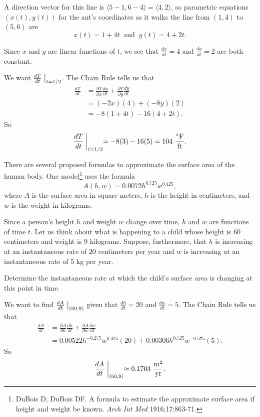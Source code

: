 \begin{exercises}
\begin{exerciseSolution}
    \ba
    \item A direction vector for this line is $\langle 5-1, 6-4 \rangle = \langle 4, 2 \rangle$, so parametric equations $(x(t),y(t))$ for the ant's coordinates as it walks the line from $(1,4)$ to $(5,6)$ are
\[x(t) = 1 + 4t \ \text{ and } \ y(t) = 4 + 2t.\]

	\item Since $x$ and $y$ are linear functions of $t$, we see that $\frac{dx}{dt} = 4$ and $\frac{dy}{dt} = 2$ are both constant. 
	
	\item We want $\frac{dT}{dt}\bigm|_{t=1/2}$. The Chain Rule tells us that 
	\begin{align*}
	\frac{dT}{dt} &= \frac{\partial T}{\partial x} \frac{dx}{dt} + \frac{\partial T}{\partial y} \frac{dy}{dt} \\
		&= (-2x)(4) + (-8y)(2) \\
		&= -8(1 + 4t) - 16(4 + 2t).
	\end{align*}
	So
	\[\frac{dT}{dt}\biggm|_{t=1/2} = -8(3) - 16(5) = 104 \ \frac{^{\circ}\text{F}}{\text{ft}}.\]
		
    \ea  
\end{exerciseSolution}
     
\item There are several proposed formulas to approximate the surface
   area of the human body.
   One model\footnote{DuBois D, DuBois DF. A formula to
     estimate the approximate surface area if height and weight be
     known.  \emph{Arch Int Med} 1916;17:863-71.} uses the formula
   $$
    A(h,w) = 0.0072 h^{0.725}w^{0.425},
   $$
   where $A$ is the surface area in square meters, $h$ is the
   height in centimeters, and $w$ is the weight in kilograms.

   Since a person's height $h$ and weight $w$ change over time,
  $h$ and $w$ are functions of time
   $t$. Let us think about what is happening to a child whose height
  is $60$ centimeters and weight is $9$ kilograms. Suppose,
  furthermore, that 
  $h$ is increasing at an instantaneous rate of 20 centimeters per year and $w$ is
 increasing at an instantaneous rate of $5$ kg per year. 

 Determine the instantaneous rate at which the child's surface area is changing at this point in time.

\begin{exerciseSolution}
We want to find $\frac{dA}{dt}\bigm|_{(60,9)}$ given that $\frac{dh}{dt} = 20$ and $\frac{dw}{dt} = 5$. The Chain Rule tells us that 
\begin{align*}
\frac{dA}{dt} &= \frac{\partial A}{\partial h} \frac{dh}{dt} + \frac{\partial A}{\partial w} \frac{dw}{dt} \\
	&= 0.00522h^{-0.275}w^{0.425}(20) + 0.00306h^{0.725}w^{-0.575}(5).
\end{align*}
So
\[\frac{dA}{dt}\biggm|_{(60,9)} \approx 0.1703 \ \frac{\text{m}^2}{\text{yr}}.\]
\end{exerciseSolution}


\end{exercises}
